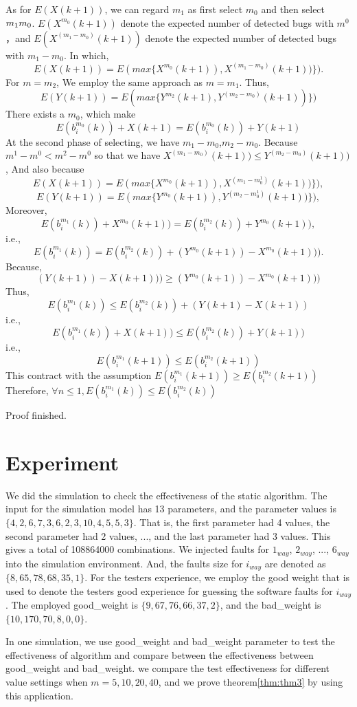 \documentclass[10pt,conference, compsocconf]{IEEEtran}
\begin{document}
\begin{CJK}{UTF8}{gkai}
As for $E(X(k+1))$, we can regard $m_1$ as first select $m_0$ 
and then select $m_1\-m_0$. 
$E(X^{m_0}(k+1))$ denote the expected number of detected bugs
with $m^0$，and 
$E(X^{(m_1-m_0)}(k+1))$ denote the expected number of detected
bugs with   $m_1-m_0$. 
In which, 
$$E(X(k+1))=E(max \{X^{m_0}(k+1)),X^{(m_1-m_0)}(k+1))\} ).$$
For $m=m_2$, We employ the same approach as $m=m_1$. 
Thus, $$E(Y(k+1))=E(max \{Y^{m_2}(k+1),Y^{(m_2-m_0)}(k+1))\})$$ 
There exists a $m_0$, which make
$$E(b_i^{m_0}(k))+X(k+1) = E(b_i^{m_0}(k))+Y(k+1)$$
At the second phase of selecting, we have $m_1-m_0$,$m_2-m_0$.
Because $m^1-m^0<m^2-m^0$
so that we have $X^{(m_1-m_0)}(k+1)) \leq Y^{(m_2-m_0)}(k+1))$ ,
And also because
$$E(X(k+1)) =E(max \{X^{m_0}(k+1)),X^{(m_1-m^1_0)}(k+1))\} ),$$
$$E(Y(k+1)) =E(max \{Y^{m_0}(k+1)),Y^{(m_2-m^1_0)}(k+1))\} ),$$
Moreover, 
$$E(b_i^{m_1}(k))+X^{m_0}(k+1)) = E(b_i^{m_2}(k))+Y^{m_0}(k+1)),$$
i.e.,
$$E(b_i^{m_1}(k)) = E(b_i^{m_2}(k))+ (Y^{m_0}(k+1)) - X^{m_0}(k+1))).$$
Because,  
$$(Y(k+1)) - X(k+1)))\geq (Y^{m_0}(k+1)) - X^{m_0}(k+1)))$$
Thus,
$$E(b_i^{m_1}(k)) \leq  E(b_i^{m_2}(k))+(Y(k+1) - X(k+1))$$
i.e.,
$$E(b_i^{m_1}(k))+ X(k+1)) \leq E(b_i^{m_2}(k))+Y(k+1))$$
i.e.,
$$ E(b_i^{m_1}(k+1)) \leq E(b_i^{m_2}(k+1))$$
This contract with the assumption $ E(b_i^{m_1}(k+1)) \geq E(b_i^{m_2}(k+1))$
Therefore, $\forall n \leq  1 ,E(b_i^{m_1}(k)) \leq E(b_i^{m_2}(k)) $

Proof finished.

\section{Experiment}
\label{sec:exp}
We did the simulation to check the effectiveness of the static algorithm.
The input for the simulation model has 13 parameters, and the parameter
values is $\{4,2,6,7,3,6,2,3,10,4,5,5,3\}$. That is, the first parameter
had 4 values, the second parameter had 2 values, ..., and the last parameter
had 3 values. This gives a total of 108864000 combinations. 
We injected faults for $1_{way}$, $2_{way}$, ..., $6_{way}$ into the
simulation environment. And, the faults size for $i_{way}$ are denoted 
as $\{8, 65, 78, 68, 35, 1\}$.
For the testers experience, we employ the good weight that is used to denote 
the testers good experience for guessing the software faults for $i_{way}$. 
The employed good\_weight is $\{9,67,76,66,37,2\}$, 
and the bad\_weight is $\{10,170,70,8,0,0\}$.

In one simulation, we use good\_weight and bad\_weight parameter
to test the effectiveness of algorithm and compare between the
effectiveness between good\_weight and bad\_weight.
we compare the test effectiveness for 
different value settings when $m=5,10,20,40$, and we prove 
theorem\ref{thm:thm3} by using this application.  


\end{CJK}
\end{document}
